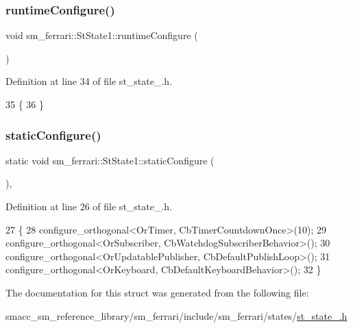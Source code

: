 \subsubsection{\texorpdfstring{runtime\+Configure()}{runtimeConfigure()}}
{\footnotesize\ttfamily void sm\+\_\+ferrari\+::\+St\+State1\+::runtime\+Configure (\begin{DoxyParamCaption}{ }\end{DoxyParamCaption})\hspace{0.3cm}{\ttfamily [inline]}}



Definition at line 34 of file st\+\_\+state\+\_.\+h.


\begin{DoxyCode}
35     \{
36     \}
\end{DoxyCode}
\mbox{\label{structsm__ferrari_1_1StState1_a9b9203b9ef7001c90e76bbc687baae43}} 
\subsubsection{\texorpdfstring{static\+Configure()}{staticConfigure()}}
{\footnotesize\ttfamily static void sm\+\_\+ferrari\+::\+St\+State1\+::static\+Configure (\begin{DoxyParamCaption}{ }\end{DoxyParamCaption})\hspace{0.3cm}{\ttfamily [inline]}, {\ttfamily [static]}}



Definition at line 26 of file st\+\_\+state\+\_.\+h.


\begin{DoxyCode}
27     \{
28         configure\_orthogonal<OrTimer, CbTimerCountdownOnce>(10);   
29         configure\_orthogonal<OrSubscriber, CbWatchdogSubscriberBehavior>();
30         configure\_orthogonal<OrUpdatablePublisher, CbDefaultPublishLoop>();
31         configure\_orthogonal<OrKeyboard, CbDefaultKeyboardBehavior>();
32     \}
\end{DoxyCode}


The documentation for this struct was generated from the following file\+:\begin{DoxyCompactItemize}
\item 
smacc\+\_\+sm\+\_\+reference\+\_\+library/sm\+\_\+ferrari/include/sm\+\_\+ferrari/states/\hyperlink{sm__ferrari_2include_2sm__ferrari_2states_2st__state__1_8h}{st\+\_\+state\+\_.\+h}\end{DoxyCompactItemize}
